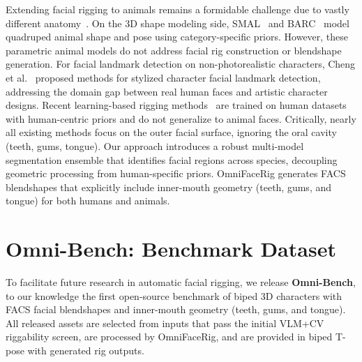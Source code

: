 \documentclass[acmtog,anonymous,review]{acmart}
\begin{document}
Extending facial rigging to animals remains a formidable challenge due to vastly different anatomy~\cite{danieau2019automatic}. On the 3D shape modeling side, SMAL~\cite{zuffi2017menagerie} and BARC~\cite{rueegg2023barc} model quadruped animal shape and pose using category-specific priors. However, these parametric animal models do not address facial rig construction or blendshape generation. For facial landmark detection on non-photorealistic characters, Cheng et al.~\cite{cheng2024stylizedfacepoint} proposed methods for stylized character facial landmark detection, addressing the domain gap between real human faces and artistic character designs. Recent learning-based rigging methods~\cite{qin2023neural, ma2025riganyface} are trained on human datasets with human-centric priors and do not generalize to animal faces. Critically, nearly all existing methods focus on the outer facial surface, ignoring the oral cavity (teeth, gums, tongue). Our approach introduces a robust multi-model segmentation ensemble that identifies facial regions across species, decoupling geometric processing from human-specific priors. OmniFaceRig generates FACS blendshapes that explicitly include inner-mouth geometry (teeth, gums, and tongue) for both humans and animals.

\section{Omni-Bench: Benchmark Dataset}
\label{sec:benchmark}

To facilitate future research in automatic facial rigging, we release \textbf{Omni-Bench}, to our knowledge the first open-source benchmark of biped 3D characters with FACS facial blendshapes and inner-mouth geometry (teeth, gums, and tongue). All released assets are selected from inputs that pass the initial VLM+CV riggability screen, are processed by OmniFaceRig, and are provided in biped T-pose with generated rig outputs.
\end{document}
